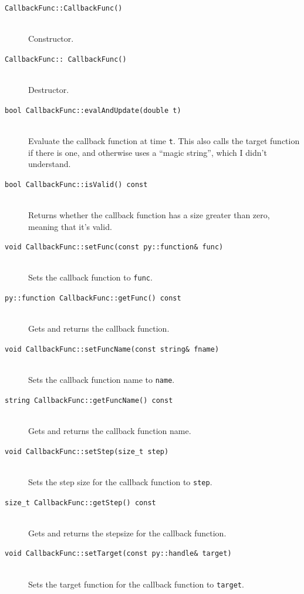 \documentclass {scrbook}
\newcommand {\ttt} {\texttt}
\begin{document}
\begin{description}

\item[\ttt{CallbackFunc::CallbackFunc()}]
\hfill \\
Constructor.

\item[\ttt{CallbackFunc::~CallbackFunc()}]
\hfill \\
Destructor.

\item[\ttt{bool CallbackFunc::evalAndUpdate(double t)}]
\hfill \\
Evaluate the callback function at time \ttt{t}. This also calls the target function if there is one, and otherwise uses a ``magic string'', which I didn't understand.

\item[\ttt{bool CallbackFunc::isValid() const}]
\hfill \\
Returns whether the callback function has a size greater than zero, meaning that it's valid.

\item[\ttt{void CallbackFunc::setFunc(const py::function\& func)}]
\hfill \\
Sets the callback function to \ttt{func}.

\item[\ttt{py::function CallbackFunc::getFunc() const}]
\hfill \\
Gets and returns the callback function.

\item[\ttt{void CallbackFunc::setFuncName(const string\& fname)}]
\hfill \\
Sets the callback function name to \ttt{name}.

\item[\ttt{string CallbackFunc::getFuncName() const}]
\hfill \\
Gets and returns the callback function name.

\item[\ttt{void CallbackFunc::setStep(size\_t step)}]
\hfill \\
Sets the step size for the callback function to \ttt{step}.

\item[\ttt{size\_t CallbackFunc::getStep() const}]
\hfill \\
Gets and returns the stepsize for the callback function.

\item[\ttt{void CallbackFunc::setTarget(const py::handle\& target)}]
\hfill \\
Sets the target function for the callback function to \ttt{target}.


\end{description}
\end{document}
